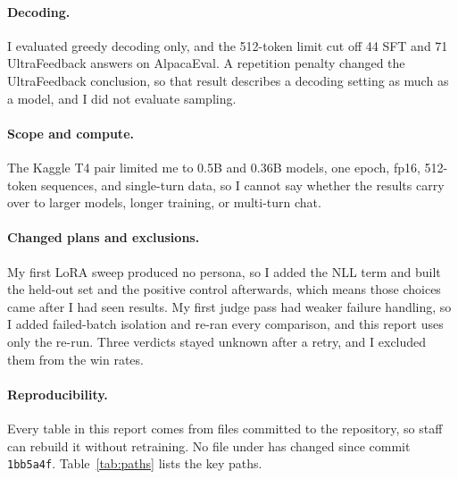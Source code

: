\paragraph{Decoding.} I evaluated greedy decoding only, and the 512-token limit cut off 44 SFT and 71 UltraFeedback answers on AlpacaEval. A repetition penalty changed the UltraFeedback conclusion, so that result describes a decoding setting as much as a model, and I did not evaluate sampling.

\paragraph{Scope and compute.} The Kaggle T4 pair limited me to 0.5B and 0.36B models, one epoch, fp16, 512-token sequences, and single-turn data, so I cannot say whether the results carry over to larger models, longer training, or multi-turn chat.

\paragraph{Changed plans and exclusions.} My first LoRA sweep produced no persona, so I added the NLL term and built the held-out set and the positive control afterwards, which means those choices came after I had seen results. My first judge pass had weaker failure handling, so I added failed-batch isolation and re-ran every comparison, and this report uses only the re-run. Three verdicts stayed unknown after a retry, and I excluded them from the win rates.

\paragraph{Reproducibility.} Every table in this report comes from files committed to the repository, so staff can rebuild it without retraining. No file under  has changed since commit \texttt{1bb5a4f}. Table~\ref{tab:paths} lists the key paths.

